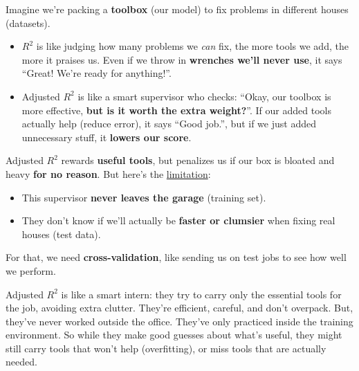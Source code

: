 \begin{examplebox}[: Analogy]
    Imagine we're packing a \textbf{toolbox} (our model) to fix problems in different houses (datasets).
    \begin{itemize}
        \item $R^2$ is like judging how many problems we \emph{can} fix, the more tools we add, the more it praises us. Even if we throw in \textbf{wrenches we'll never use}, it says ``Great! We're ready for anything!''.
        \item Adjusted $R^2$ is like a smart supervisor who checks: ``Okay, our toolbox is more effective, \textbf{but is it worth the extra weight?}''. If our added tools actually help (reduce error), it says ``Good job.'', but if we just added unnecessary stuff, it \textbf{lowers our score}.
    \end{itemize}
    Adjusted $R^2$ rewards \textbf{useful tools}, but penalizes us if our box is bloated and heavy \textbf{for no reason}. But here's the \underline{limitation}:
    \begin{itemize}
        \item This supervisor \textbf{never leaves the garage} (training set).
        \item They don't know if we'll actually be \textbf{faster or clumsier} when fixing real houses (test data).
    \end{itemize}
    For that, we need \textbf{cross-validation}, like sending us on test jobs to see how well we perform.

    \highspace
    Adjusted $R^2$ is like a smart intern: they try to carry only the essential tools for the job, avoiding extra clutter. They're efficient, careful, and don't overpack. But, they've never worked outside the office. They've only practiced inside the training environment. So while they make good guesses about what's useful, they might still carry tools that won't help (overfitting), or miss tools that are actually needed.
\end{examplebox}

\newpage

